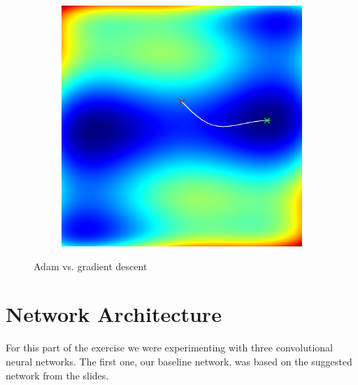\documentclass[sigconf,nonacm]{acmart}
\begin{document}
\begin{figure}[ht]
\begin{subfigure}[c]{0.45\columnwidth}
\includegraphics[width=\textwidth]{adam-camel.png}
\end{subfigure}
\vspace{-.7\baselineskip}
\caption{Adam vs. gradient descent}
\label{p1:momentum}
\end{figure}

\section{Network Architecture}

For this part of the exercise we were
experimenting with three convolutional neural networks.
The first one, our baseline network, was
based on the suggested network from the slides.
\end{document}
